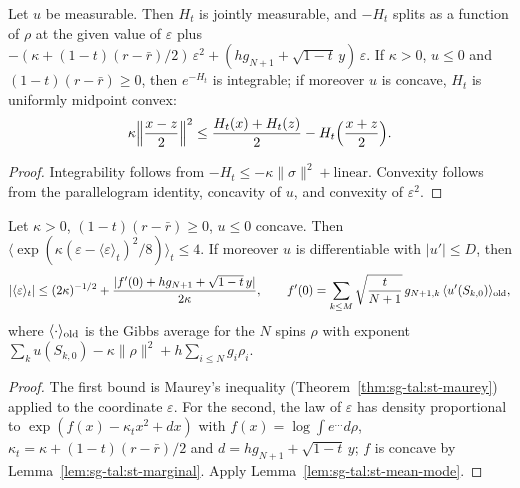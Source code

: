 \begin{lemma}\label{lem:sg-tal:st-cavity-regular}
  \leanok
Let $u$ be measurable. Then $H_t$ is jointly measurable, and $-H_t$ splits as a function of $\rho$ at the given
value of $\varepsilon$ plus
$-(\kappa+(1-t)(r-\bar r)/2)\,\varepsilon^2+(hg_{N+1}+\sqrt{1-t}\,y)\,\varepsilon$. If $\kappa>0$, $u\le0$ and
$(1-t)(r-\bar r)\ge0$, then $e^{-H_t}$ is integrable; if moreover $u$ is concave, $H_t$ is uniformly midpoint
convex:
\[
\kappa\Bigl\|\frac{x-z}2\Bigr\|^2\le\frac{H_t(x)+H_t(z)}2-H_t\Bigl(\frac{x+z}2\Bigr).
\]
\end{lemma}
\begin{proof}
  \leanok
Integrability follows from $-H_t\le-\kappa\|\sigma\|^2+\text{linear}$. Convexity follows from the parallelogram
identity, concavity of $u$, and convexity of $\varepsilon^2$.
\end{proof}

\begin{lemma}\label{lem:sg-tal:st-last-spin}
  \leanok
Let $\kappa>0$, $(1-t)(r-\bar r)\ge0$, $u\le0$ concave. Then
$\langle\exp(\kappa(\varepsilon-\langle\varepsilon\rangle_t)^2/8)\rangle_t\le4$. If moreover $u$ is
differentiable with $|u'|\le D$, then
\[
|\langle\varepsilon\rangle_t|\le(2\kappa)^{-1/2}+\frac{|f'(0)+hg_{N+1}+\sqrt{1-t}\,y|}{2\kappa},\qquad
f'(0)=\sum_{k\le M}\sqrt{\frac t{N+1}}\,g_{N+1,k}\,\langle u'(S_{k,0})\rangle_{\rm old},
\]
where $\langle\cdot\rangle_{\rm old}$ is the Gibbs average for the $N$ spins $\rho$ with exponent
$\sum_ku(S_{k,0})-\kappa\|\rho\|^2+h\sum_{i\le N}g_i\rho_i$.
\end{lemma}
\begin{proof}
  \leanok
The first bound is Maurey's inequality (Theorem~\ref{thm:sg-tal:st-maurey}) applied to the coordinate
$\varepsilon$. For the second, the law of $\varepsilon$ has density proportional to
$\exp(f(x)-\kappa_tx^2+dx)$ with $f(x)=\log\int e^{\ldots}d\rho$,
$\kappa_t=\kappa+(1-t)(r-\bar r)/2$ and $d=hg_{N+1}+\sqrt{1-t}\,y$; $f$ is concave by
Lemma~\ref{lem:sg-tal:st-marginal}. Apply Lemma~\ref{lem:sg-tal:st-mean-mode}.
\end{proof}

